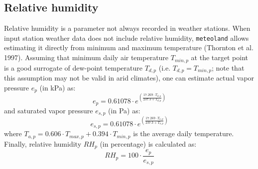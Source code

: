 \documentclass[11pt,a4paper]{article}
\begin{document}
\subsection{Relative humidity}
Relative humidity is a parameter not always recorded in weather stations. When input station weather data does not include relative humidity, \texttt{meteoland} allows estimating it directly from minimum and maximum temperature (Thornton et al. 1997). Assuming that minimum daily air temperature $T_{min,p}$ at the target point is a good surrogate of dew-point temperature $T_{d,p}$ (i.e. $T_{d,p} = T_{min,p}$; note that this assumption may not be valid in arid climates), one can estimate actual vapor pressure $e_{p}$ (in kPa) as:
\begin{equation}
e_{p} = 0.61078 \cdot e^{\left(\frac{17.269\cdot T_{d,p}}{237.3+T_{d,p}}\right)}
\end{equation}
and saturated vapor pressure $e_{s,p}$ (in Pa) as:
\begin{equation}
e_{s,p} = 0.61078 \cdot e^{\left(\frac{17.269\cdot T_{a,p}}{237.3+T_{a,p}}\right)}
\end{equation}
where $T_{a,p} = 0.606 \cdot T_{max,p} + 0.394 \cdot T_{min,p}$ is the average daily temperature. Finally, relative humidity $RH_p$ (in percentage) is calculated as:
\begin{equation}
RH_p = 100 \cdot \frac{e_{p}}{e_{s,p}}
\end{equation}
\end{document}

